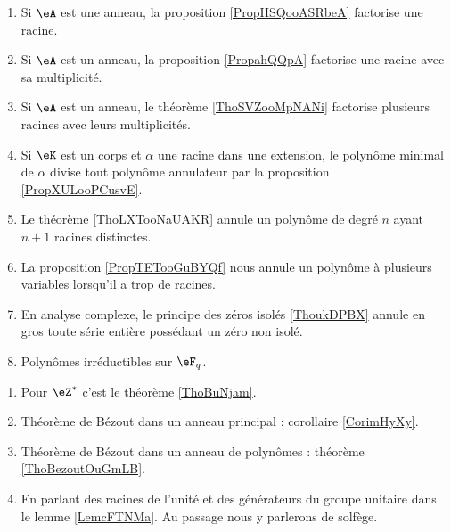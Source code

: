     \begin{enumerate}
        \item
            Si \( \eA\) est une anneau, la proposition \ref{PropHSQooASRbeA} factorise une racine.
        \item
            Si \( \eA\) est un anneau, la proposition \ref{PropahQQpA} factorise une racine avec sa multiplicité.
        \item
            Si \( \eA\) est un anneau, le théorème \ref{ThoSVZooMpNANi} factorise plusieurs racines avec leurs multiplicités.
        \item
            Si \( \eK\) est un corps et \( \alpha\) une racine dans une extension, le polynôme minimal de \( \alpha\) divise tout polynôme annulateur par la proposition \ref{PropXULooPCusvE}.
        \item
            Le théorème \ref{ThoLXTooNaUAKR} annule un polynôme de degré \( n\) ayant \( n+1\) racines distinctes.
        \item
            La proposition \ref{PropTETooGuBYQf} nous annule un polynôme à plusieurs variables lorsqu'il a trop de racines.
        \item
            En analyse complexe, le principe des zéros isolés \ref{ThoukDPBX} annule en gros toute série entière possédant un zéro non isolé.
        \item 
            Polynômes irréductibles sur \( \eF_q\).
        \end{enumerate}

    \begin{enumerate}
        \item
            Pour \( \eZ^*\) c'est le théorème \ref{ThoBuNjam}.
        \item
            Théorème de Bézout dans un anneau principal : corollaire \ref{CorimHyXy}.
        \item
            Théorème de Bézout dans un anneau de polynômes : théorème \ref{ThoBezoutOuGmLB}.
        \item
            En parlant des racines de l'unité et des générateurs du groupe unitaire dans le lemme \ref{LemcFTNMa}. Au passage nous y parlerons de solfège.
        \end{enumerate}

